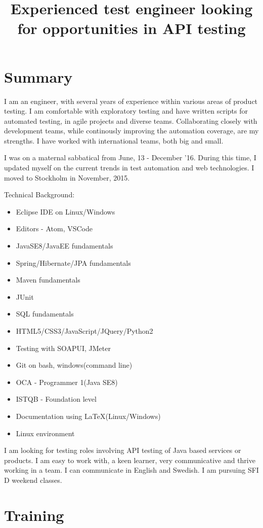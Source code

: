 \documentclass[12pt,a4paper,sans]{moderncv} %
\title{Experienced test engineer looking for opportunities in API testing}
\begin{document}
\makecvtitle


\section{Summary}
I am an engineer, with several years of experience within various areas of product testing. I am comfortable with exploratory testing and have written scripts for automated testing, in
agile projects and diverse teams. Collaborating closely with development teams, while continously improving the automation coverage, are my strengths.
I have worked with international teams, both big and small.

\hfill \break
I was on a maternal sabbatical from June, 13 - December '16. During this time, I updated myself on the current trends in test automation and web technologies. I moved to Stockholm in November, 2015.

\hfill \break
Technical Background:
	\begin{itemize}
	\item Eclipse IDE on Linux/Windows
	\item Editors - Atom, VSCode
	\item JavaSE8/JavaEE fundamentals
	\item Spring/Hibernate/JPA fundamentals
	\item Maven fundamentals
	\item JUnit
	\item SQL fundamentals
	\item HTML5/CSS3/JavaScript/JQuery/Python2
	\item Testing with SOAPUI, JMeter 
	\item Git on bash, windows(command line)
	\item OCA - Programmer 1(Java SE8)
	\item ISTQB - Foundation level
	\item Documentation using LaTeX(Linux/Windows)
	\item Linux environment
 	\end{itemize}

\hfill \break
I am looking for testing roles involving API testing of Java based services or products. I am easy to work with,
a keen learner, very communicative and thrive working in a team. I can communicate in English and Swedish.
I am pursuing SFI D weekend classes.

\section{Training}
\end{document}
